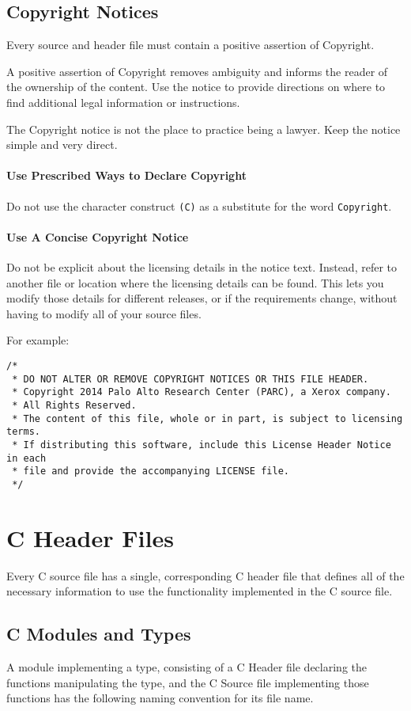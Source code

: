 \documentclass[fleqn,12pt]{PARCOneColumn} %
\begin{document}
\subsection{Copyright Notices}
Every source and header file must contain a positive assertion of Copyright.

A positive assertion of Copyright removes ambiguity and informs the reader of the ownership of the content.
Use the notice to provide directions on where to find additional
legal information or instructions.

The Copyright notice is not the place to practice being a lawyer.  Keep the notice simple and very direct.

\paragraph{Use Prescribed Ways to Declare Copyright}
Do not use the character construct {\tt (C)} as a substitute for the word {\tt Copyright}.

\paragraph{Use A Concise Copyright Notice}
Do not be explicit about the licensing details in the notice text.
Instead, refer to another file or location where the licensing details can be found.
This lets you modify those details for different releases,
or if the requirements change,
without having to modify all of your source files.

For example:
\begin{lstlisting}[caption=A Canonical Copyright Notice]
/*
 * DO NOT ALTER OR REMOVE COPYRIGHT NOTICES OR THIS FILE HEADER.
 * Copyright 2014 Palo Alto Research Center (PARC), a Xerox company.
 * All Rights Reserved.
 * The content of this file, whole or in part, is subject to licensing terms.
 * If distributing this software, include this License Header Notice in each
 * file and provide the accompanying LICENSE file.
 */
\end{lstlisting}
\section{C Header Files}
Every C source file has a single,
corresponding C header file that defines all of the necessary information to use the functionality implemented in the C source file.

\subsection{C Modules and Types}
A module implementing a type, consisting of a C Header file declaring the functions manipulating the type, and the C Source file implementing those functions has the following naming convention for its file name.
\end{document}
